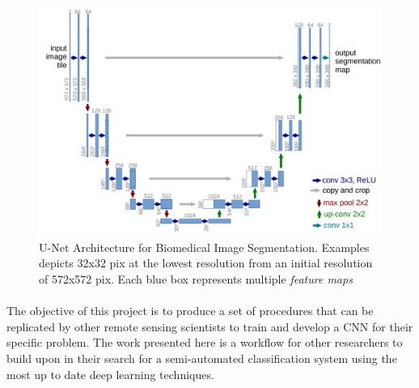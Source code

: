 \begin{figure}[htbp]
    \centering
    \includegraphics[width=\textwidth]{Part2/chapter3/chapter/figs/unet_arch.PNG}
    \caption[U-Net Architecture for Biomedical Image Segmentation]{U-Net Architecture for Biomedical Image Segmentation. Examples depicts 32x32 pix at the lowest resolution from an initial resolution of 572x572 pix. Each blue box represents multiple \textit{feature maps} }
    \label{fig.U_NET}
\end{figure}
\paragraph{}
The objective of this project is to produce a set of procedures that can be replicated by other remote sensing scientists to train and develop a CNN for their specific problem. The work presented here is a workflow for other researchers to build upon in their search for a semi-automated classification system using the most up to date deep learning techniques.





